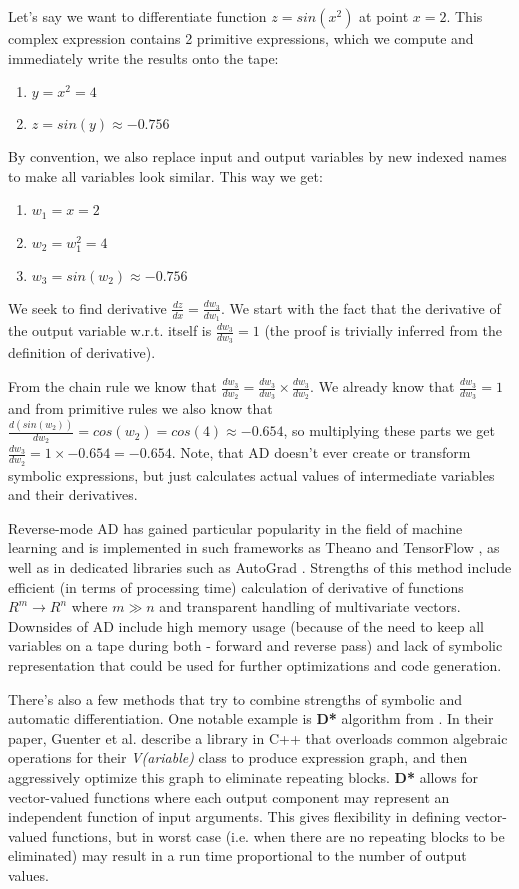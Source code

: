 \documentclass[conference]{IEEEtran}
\begin{document}
Let's say we want to differentiate function $z = sin(x^2)$ at point
$x = 2$. This complex expression contains 2 primitive expressions,
which we compute and immediately write the results onto the tape:

\begin{enumerate}
\item $y = x^2 = 4$
\item $z = sin(y) \approx -0.756$
\end{enumerate}

By convention, we also replace input and output variables by new
indexed names to make all variables look similar. This way we get:

\begin{enumerate}
\item $w_1 = x = 2$
\item $w_2 = w_1^2 = 4$
\item $w_3 = sin(w_2) \approx -0.756$
\end{enumerate}

We seek to find derivative $\frac{dz}{dx} = \frac{dw_3}{dw_1}$. We
start with the fact that the derivative of the output variable
w.r.t. itself is $\frac{dw_3}{dw_3} = 1$ (the proof is trivially
inferred from the definition of derivative).


From the chain rule we know that
$\frac{dw_3}{dw_2} = \frac{dw_3}{dw_3} \times \frac{dw_3}{dw_2}$. We
already know that $\frac{dw_3}{dw_3} = 1$ and from primitive rules we
also know that
$\frac{d(sin(w_2))}{dw_2} = cos(w_2) = cos(4) \approx -0.654$, so
multiplying these parts we get
$\frac{dw_3}{dw_2} = 1 \times −0.654 = −0.654$.  Note, that AD doesn't
ever create or transform symbolic expressions, but just calculates
actual values of intermediate variables and their derivatives.

Reverse-mode AD has gained particular popularity in the field of
machine learning and is implemented in such frameworks as Theano
\cite{Theano} and TensorFlow \cite{TensorFlow}, as well as in
dedicated libraries such as AutoGrad \cite{AutoGrad}. Strengths of
this method include efficient (in terms of processing time)
calculation of derivative of functions $R^m \to R^n$ where $m \gg n$
and transparent handling of multivariate vectors. Downsides of AD
include high memory usage (because of the need to keep all variables
on a tape during both - forward and reverse pass) and lack of symbolic
representation that could be used for further optimizations and code
generation.

There's also a few methods that try to combine strengths of symbolic
and automatic differentiation. One notable example is \textbf{D*}
algorithm from \cite{guenter2007}. In their paper, Guenter et
al. describe a library in C++ that overloads common algebraic
operations for their \textit{V(ariable)} class to produce expression
graph, and then aggressively optimize this graph to eliminate
repeating blocks. \textbf{D*} allows for vector-valued functions where
each output component may represent an independent function of input
arguments. This gives flexibility in defining vector-valued functions,
but in worst case (i.e. when there are no repeating blocks to be
eliminated) may result in a run time proportional to the number of
output values.
\end{document}
